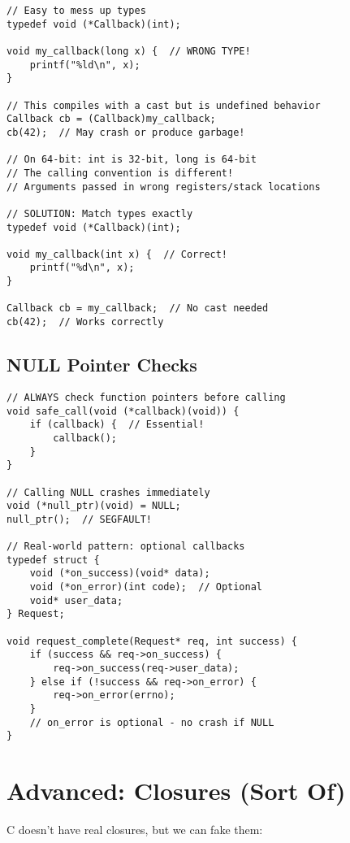 \begin{lstlisting}
// Easy to mess up types
typedef void (*Callback)(int);

void my_callback(long x) {  // WRONG TYPE!
    printf("%ld\n", x);
}

// This compiles with a cast but is undefined behavior
Callback cb = (Callback)my_callback;
cb(42);  // May crash or produce garbage!

// On 64-bit: int is 32-bit, long is 64-bit
// The calling convention is different!
// Arguments passed in wrong registers/stack locations

// SOLUTION: Match types exactly
typedef void (*Callback)(int);

void my_callback(int x) {  // Correct!
    printf("%d\n", x);
}

Callback cb = my_callback;  // No cast needed
cb(42);  // Works correctly
\end{lstlisting}

\subsection{NULL Pointer Checks}

\begin{lstlisting}
// ALWAYS check function pointers before calling
void safe_call(void (*callback)(void)) {
    if (callback) {  // Essential!
        callback();
    }
}

// Calling NULL crashes immediately
void (*null_ptr)(void) = NULL;
null_ptr();  // SEGFAULT!

// Real-world pattern: optional callbacks
typedef struct {
    void (*on_success)(void* data);
    void (*on_error)(int code);  // Optional
    void* user_data;
} Request;

void request_complete(Request* req, int success) {
    if (success && req->on_success) {
        req->on_success(req->user_data);
    } else if (!success && req->on_error) {
        req->on_error(errno);
    }
    // on_error is optional - no crash if NULL
}
\end{lstlisting}

\section{Advanced: Closures (Sort Of)}

C doesn't have real closures, but we can fake them:

